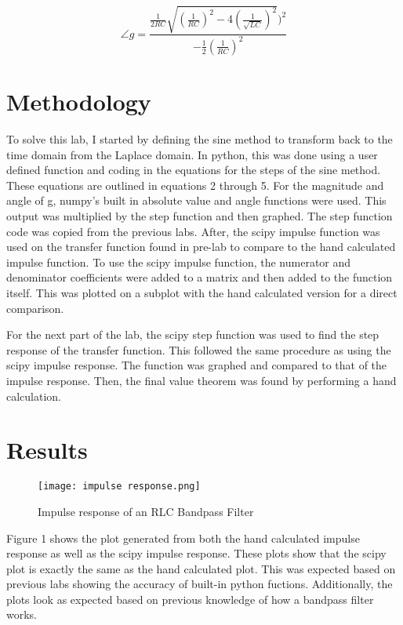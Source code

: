 \documentclass[12pt, titlepage]{article}
\begin{document}
                \begin{equation}
                    \angle g = \frac{\frac{1}{2RC}\sqrt{(\frac{1}{RC})^2-4(\frac{1}{\sqrt{LC}})^2})^2}{-\frac{1}{2}(\frac{1}{RC})^2}
                \end{equation}
        
        \section{Methodology}
        To solve this lab, I started by defining the sine method to transform back to the time domain from the Laplace domain.  In python, this was done using a user defined function and coding in the equations for the steps of the sine method.  These equations are outlined in equations 2 through 5.  For the magnitude and angle of g, numpy's built in absolute value and angle functions were used.  This output was multiplied by the step function and then graphed.  The step function code was copied from the previous labs.  After, the scipy impulse function was used on the transfer function found in pre-lab to compare to the hand calculated impulse function.  To use the scipy impulse function, the numerator and denominator coefficients were added to a matrix and then added to the function itself.  This was plotted on a subplot with the hand calculated version for a direct comparison.
        
        For the next part of the lab, the scipy step function was used to find the step response of the transfer function.  This followed the same procedure as using the scipy impulse response.  The function was graphed and compared to that of the impulse response. Then, the final value theorem was found by performing a hand calculation.
        
        \section{Results}
        \begin{figure}[h!]
            \centering
            \texttt{[image: impulse response.png]}
            \caption{Impulse response of an RLC Bandpass Filter}
            \label{fig:my_label}
        \end{figure}
        \clearpage
        Figure 1 shows the plot generated from both the hand calculated impulse response as well as the scipy impulse response.  These plots show that the scipy plot is exactly the same as the hand calculated plot.  This was expected based on previous labs showing the accuracy of built-in python fuctions.  Additionally, the plots look as expected based on previous knowledge of how a bandpass filter works.
        
\end{document}
